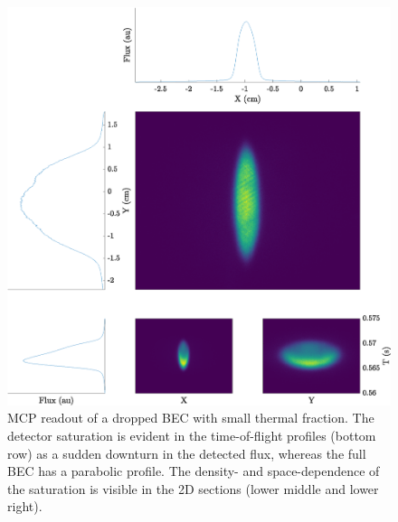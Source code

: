 	 \newpage
	 \begin{figure}
	 	\centering
	 	\includegraphics[width=\textwidth]{fig/apparatus/dropped_bec}
	 	\caption{MCP readout of a dropped BEC with small thermal fraction. The detector saturation is evident in the time-of-flight profiles (bottom row) as a sudden downturn in the detected flux, whereas the full BEC has a parabolic profile. The density- and space-dependence of the saturation is visible in the 2D sections (lower middle and lower right).}
	 	\label{fig:dropped_bec}
	 \end{figure}

